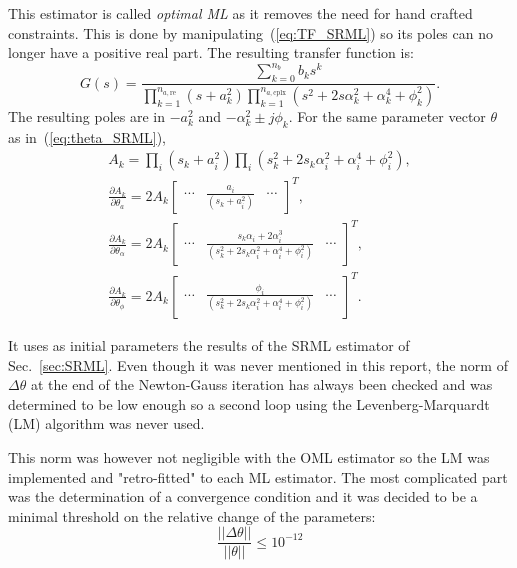This estimator is called \textit{optimal ML} as it removes the need for hand crafted constraints. This is done by manipulating~(\ref{eq:TF_SRML}) so its poles can no longer have a positive real part. The resulting transfer function is:
\begin{equation}
    G(s) = \frac{\sum_{k=0}^{n_b} b_k s^k}{\prod_{k=1}^{n_{a, \text{re}}} (s+a_k^2) \prod_{k=1}^{n_{a, \text{cplx}}} (s^2 + 2 s \alpha_k^2 + \alpha_k^4 + \phi_k^2)}.
    \label{eq:TF_OML}
\end{equation}
The resulting poles are in $-a_k^2$ and $-\alpha_k^2 \pm j\phi_k$. For the same parameter vector $\theta$ as in~(\ref{eq:theta_SRML}),
\begin{gather}
    A_k = \prod_{i} (s_k+a_i^2) \prod_{i} (s_k^2 + 2 s_k \alpha_i^2 + \alpha_i^4 + \phi_i^2),\\
    \frac{\partial A_k}{\partial \theta_a} = 2 A_k \begin{bmatrix}
        \cdots & \frac{a_i}{(s_k+a_i^2)} & \cdots
    \end{bmatrix}^T,\\
    \frac{\partial A_k}{\partial \theta_\alpha} = 2 A_k \begin{bmatrix}
        \cdots & \frac{s_k\alpha_i + 2\alpha_i^3}{(s_k^2 + 2 s_k \alpha_i^2 + \alpha_i^4 + \phi_i^2)} & \cdots
    \end{bmatrix}^T, \\
    \frac{\partial A_k}{\partial \theta_\phi} = 2 A_k \begin{bmatrix}
        \cdots & \frac{\phi_i}{(s_k^2 + 2 s_k \alpha_i^2 + \alpha_i^4 + \phi_i^2)} & \cdots
    \end{bmatrix}^T.
\end{gather}

It uses as initial parameters the results of the SRML estimator of Sec.~\ref{sec:SRML}. Even though it was never mentioned in this report, the norm of $\Delta \theta$ at the end of the Newton-Gauss iteration has always been checked and was determined to be low enough so a second loop using the Levenberg-Marquardt (LM) algorithm was never used.

This norm was however not negligible with the OML estimator so the LM was implemented and "retro-fitted" to each ML estimator. The most complicated part was the determination of a convergence condition and it was decided to be a minimal threshold on the relative change of the parameters:
\begin{equation}
    \frac{||\Delta\theta||}{||\theta||} \leq 10^{-12}
\end{equation}

